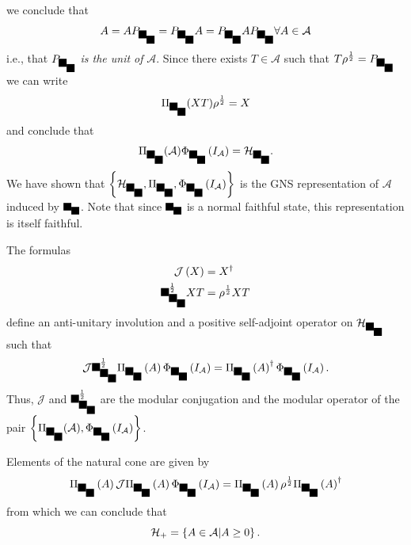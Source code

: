 \documentclass[aps,preprint]{revtex4}%
\providecommand{\U}[1]{\protect\rule{.1in}{.1in}}
\begin{document}
we conclude that
\begin{equation}
A=AP_{\U{3c9} _{\U{3c1} }}=P_{\U{3c9} _{\U{3c1} }}A=P_{\U{3c9} _{\U{3c1} }%
}AP_{\U{3c9} _{\U{3c1} }}\forall A\in\mathcal{A}%
\end{equation}
i.e., that $P_{\U{3c9} _{\U{3c1} }}$ \emph{is the unit of} $\mathcal{A}$.
Since there exists $T\in\mathcal{A}$ such that $T\rho^{\frac{1}{2}}=P_{\U{3c9}
_{\U{3c1} }}$ we can write
\begin{equation}
\Pi_{\U{3c9} _{\U{3c1} }}(XT)\rho^{\frac{1}{2}}=X
\end{equation}
and conclude that
\begin{equation}
\Pi_{\U{3c9} _{\U{3c1} }}(\mathcal{A})\Phi_{\U{3c9} _{\U{3c1} }}\left(
I_{\mathcal{A}}\right)  =\mathcal{H}_{\U{3c9} _{\U{3c1} }}.
\end{equation}
We have shown that $\left\{  \mathcal{H}_{\U{3c9} _{\U{3c1} }},\Pi_{\U{3c9}
_{\U{3c1} }},\Phi_{\U{3c9} _{\U{3c1} }}\left(  I_{\mathcal{A}}\right)
\right\}  $ is the GNS representation of $\mathcal{A}$ induced by $\U{3c9}
_{\U{3c1} }$. Note that since $\U{3c9} _{\U{3c1} }$ is a normal faithful
state, this representation is itself faithful.

The formulas
\begin{align}
\mathcal{J}\left(  X\right)   &  =X^{\dagger}\\
\U{2206} _{\U{3c9} _{\U{3c1} }}^{\frac{1}{2}}XT  &  =\rho^{\frac{1}{2}}XT
\end{align}
define an anti-unitary involution and a positive self-adjoint operator on
$\mathcal{H}_{\U{3c9} _{\U{3c1} }}$ such that%
\begin{equation}
\mathcal{J}\U{2206} _{\U{3c9} _{\U{3c1} }}^{\frac{1}{2}}\Pi_{\U{3c9} _{\U{3c1}
}}\left(  A\right)  \Phi_{\U{3c9} _{\U{3c1} }}\left(  I_{\mathcal{A}}\right)
=\Pi_{\U{3c9} _{\U{3c1} }}\left(  A\right)  ^{\dagger}\Phi_{\U{3c9} _{\U{3c1}
}}\left(  I_{\mathcal{A}}\right)  .
\end{equation}
Thus, $\mathcal{J}$ and $\U{2206} _{\U{3c9} _{\U{3c1} }}^{\frac{1}{2}}$ are
the modular conjugation and the modular operator of the pair $\left\{
\Pi_{\U{3c9} _{\U{3c1} }}(\mathcal{A}),\Phi_{\U{3c9} _{\U{3c1} }}\left(
I_{\mathcal{A}}\right)  \right\}  $.

Elements of the natural cone are given by
\begin{equation}
\Pi_{\U{3c9} _{\U{3c1} }}\left(  A\right)  \mathcal{J}\Pi_{\U{3c9} _{\U{3c1}
}}\left(  A\right)  \Phi_{\U{3c9} _{\U{3c1} }}\left(  I_{\mathcal{A}}\right)
=\Pi_{\U{3c9} _{\U{3c1} }}\left(  A\right)  \rho^{\frac{1}{2}}\Pi_{\U{3c9}
_{\U{3c1} }}\left(  A\right)  ^{\dagger}%
\end{equation}
from which we can conclude that%
\begin{equation}
\mathcal{H}_{+}=\left\{  A\in\mathcal{A}\text{%
$\vert$%
}A\geq0\right\}  .
\end{equation}
\end{document}
